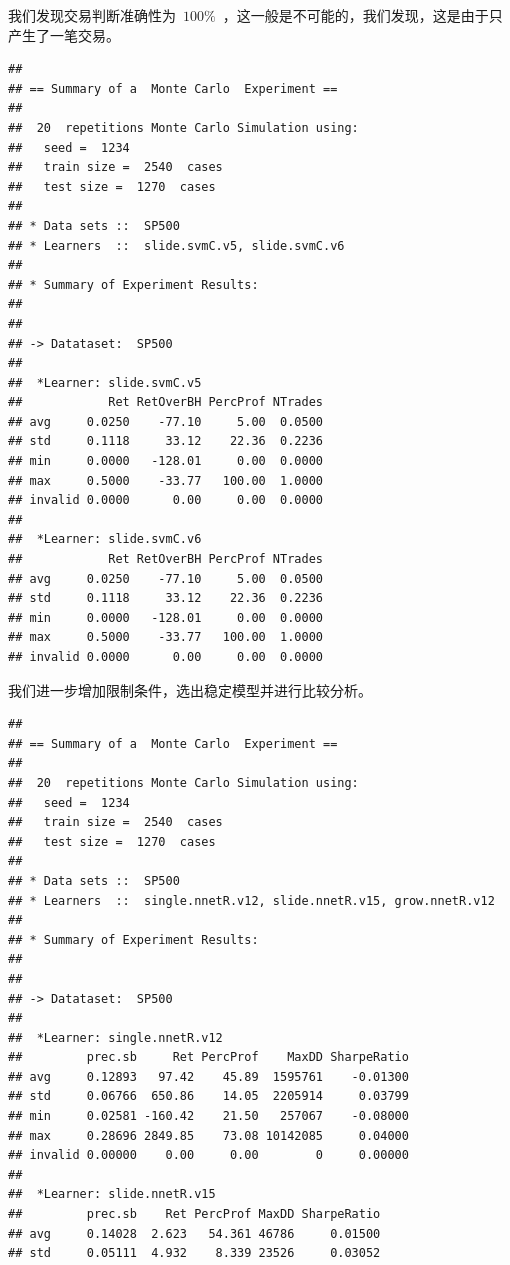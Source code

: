 \documentclass{article}\usepackage[]{graphicx}\usepackage[]{color}
\makeatletter
\newenvironment{kframe}{%
 \def\at@end@of@kframe{}%
 \ifinner\ifhmode%
  \def\at@end@of@kframe{\end{minipage}}%
  \begin{minipage}{\columnwidth}%
 \fi\fi%
 \def\FrameCommand##1{\hskip\@totalleftmargin \hskip-\fboxsep
 \colorbox{shadecolor}{##1}\hskip-\fboxsep
     \hskip-\linewidth \hskip-\@totalleftmargin \hskip\columnwidth}%
 \MakeFramed {\advance\hsize-\width
   \@totalleftmargin\z@ \linewidth\hsize
   \@setminipage}}%
 {\par\unskip\endMakeFramed%
 \at@end@of@kframe}
\newenvironment{knitrout}{}{} %
\makeatother
\begin{document}
\begin{CJK*}{UTF8}{gkai}
我们发现交易判断准确性为~$100\%$~，这一般是不可能的，我们发现，这是由于只产生了一笔交易。
\begin{knitrout}
\color{fgcolor}\begin{kframe}
\begin{verbatim}
## 
## == Summary of a  Monte Carlo  Experiment ==
## 
##  20  repetitions Monte Carlo Simulation using: 
## 	 seed =  1234 
## 	 train size =  2540  cases 
## 	 test size =  1270  cases 
## 
## * Data sets ::  SP500
## * Learners  ::  slide.svmC.v5, slide.svmC.v6
## 
## * Summary of Experiment Results:
## 
## 
## -> Datataset:  SP500 
## 
## 	*Learner: slide.svmC.v5 
##            Ret RetOverBH PercProf NTrades
## avg     0.0250    -77.10     5.00  0.0500
## std     0.1118     33.12    22.36  0.2236
## min     0.0000   -128.01     0.00  0.0000
## max     0.5000    -33.77   100.00  1.0000
## invalid 0.0000      0.00     0.00  0.0000
## 
## 	*Learner: slide.svmC.v6 
##            Ret RetOverBH PercProf NTrades
## avg     0.0250    -77.10     5.00  0.0500
## std     0.1118     33.12    22.36  0.2236
## min     0.0000   -128.01     0.00  0.0000
## max     0.5000    -33.77   100.00  1.0000
## invalid 0.0000      0.00     0.00  0.0000
\end{verbatim}
\end{kframe}
\end{knitrout}
我们进一步增加限制条件，选出稳定模型并进行比较分析。
\begin{knitrout}
\color{fgcolor}\begin{kframe}
\begin{verbatim}
## 
## == Summary of a  Monte Carlo  Experiment ==
## 
##  20  repetitions Monte Carlo Simulation using: 
## 	 seed =  1234 
## 	 train size =  2540  cases 
## 	 test size =  1270  cases 
## 
## * Data sets ::  SP500
## * Learners  ::  single.nnetR.v12, slide.nnetR.v15, grow.nnetR.v12
## 
## * Summary of Experiment Results:
## 
## 
## -> Datataset:  SP500 
## 
## 	*Learner: single.nnetR.v12 
##         prec.sb     Ret PercProf    MaxDD SharpeRatio
## avg     0.12893   97.42    45.89  1595761    -0.01300
## std     0.06766  650.86    14.05  2205914     0.03799
## min     0.02581 -160.42    21.50   257067    -0.08000
## max     0.28696 2849.85    73.08 10142085     0.04000
## invalid 0.00000    0.00     0.00        0     0.00000
## 
## 	*Learner: slide.nnetR.v15 
##         prec.sb    Ret PercProf MaxDD SharpeRatio
## avg     0.14028  2.623   54.361 46786     0.01500
## std     0.05111  4.932    8.339 23526     0.03052

\end{verbatim}
\end{kframe}
\end{knitrout}
\end{CJK*}
\end{document}
